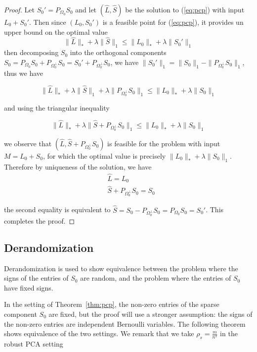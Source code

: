 \begin{proof}
Let $S_0' = P_{\Omega_0} S_0$ and let $(\hat{L}, \hat{S})$ be the solution to (\ref{eq:pcp}) with input $L_0 + S_0'$. Then since $(L_0, S_0')$ is a feasible point for (\ref{eq:pcp}), it provides un upper bound on the optimal value
\[
\|\hat{L}\|_* + \lambda \|\hat{S}\|_1 \leq \|L_0\|_* + \lambda \|S_0'\|_1
\]
then decomposing $S_0$ into the orthogonal components $S_0 = P_{\Omega_0} S_0 + P_{\Omega_0^\perp} S_0 = S_0' + P_{\Omega_0^\perp} S_0$, we have $\|S_0'\|_1 = \|S_0\|_1 - \|P_{\Omega_0^\perp} S_0\|_1$, thus we have

\[
\|\hat{L}\|_* + \lambda \|\hat{S}\|_1 + \lambda \|P_{\Omega_0^\perp} S_0\|_1 \leq \|L_0\|_* + \lambda \|S_0\|_1
\]

and using the triangular inequality

\[
\|\hat{L}\|_* + \lambda \|\hat{S} + P_{\Omega_0^\perp} S_0\|_1 \leq \|L_0\|_* + \lambda \|S_0\|_1
\]

we observe that $(\hat{L}, \hat{S} + P_{\Omega_0^\perp} S_0)$ is feasible for the problem with input $M = L_0 + S_0$, for which the optimal value is precisely $\|L_0\|_* + \lambda \|S_0\|_1$. Therefore by uniqueness of the solution, we have
\[
\begin{aligned}
&\hat{L} = L_0 \\
&\hat{S} + P_{\Omega_0^\perp} S_0 = S_0
\end{aligned}
\]

the second equality is equivalent to $\hat{S} = S_0 - P_{\Omega_0^\perp} S_0 = P_{\Omega_0} S_0 = S_0'$. This completes the proof.
\end{proof}


\subsection{Derandomization}
Derandomization is used to show equivalence between the problem where the signs of the entries of $S_0$ are random, and the problem where the entries of $S_0$ have fixed signs.

In the setting of Theorem~\ref{thm:pcp}, the non-zero entries of the sparse component $S_0$ are fixed, but the proof will use a stronger assumption: the signs of the non-zero entries are independent Bernoulli variables. The following theorem shows equivalence of the two settings. We remark that we take $\rho_s = \frac{m}{n^2}$ in the robust PCA setting

